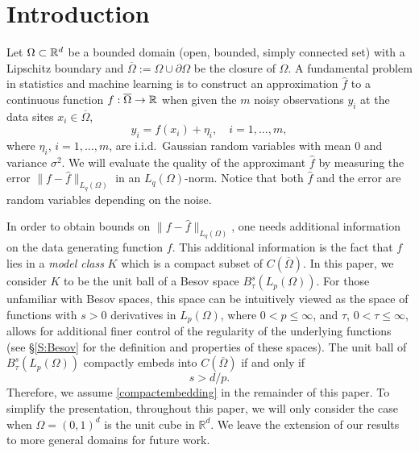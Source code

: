 \section{Introduction}
\label{intro}
Let $\Omega \subset \mathbb{R}^d$ be a bounded domain (open, bounded, simply connected set) with a Lipschitz boundary and  $\overline{\Omega}:= \Omega \cup \partial\Omega$ be the closure of $\Omega$. 
A fundamental problem in statistics and machine learning is to construct an   approximation $\hat{f}$ to a continuous function $f: \overline{\Omega}\to \mathbb{R}$ when given the $m$  noisy observations $y_i$ at the data sites $x_i\in\overline \Omega$, 
\begin{equation} \label{eq:observations}
    y_i = f(x_i) + \eta_i, \quad i = 1, \ldots, m,
\end{equation}
where  $\eta_i$, $i = 1, \ldots, m$, are i.i.d.\ Gaussian random variables with mean $0$ and variance $\sigma^2$.
We will evaluate the quality of the approximant  $\hat f$ by  measuring  the 
error $\|f-\hat f\|_{L_q(\Omega)}$  in 
an $L_q(\Omega)$-norm.  Notice that both $\hat f$ and the error  are random variables depending on the noise.
 
In order to obtain bounds on $\|f-\hat f\|_{L_q(\Omega)}$,  one  needs additional information on the data generating function $f$.  This additional information is the fact  that $f$ lies in a \emph{model class} $K$ which is a compact subset of $C(\overline{\Omega})$. In this paper, we consider $K$ to be the unit ball of a Besov space $B^s_\tau(L_p({\Omega}))$.  For those unfamiliar with Besov spaces, this space   can be intuitively viewed as the space of functions with $s > 0$ derivatives in $L_p({\Omega})$, where $0 < p \leq \infty$,  and $\tau$,   $0 < \tau \leq \infty$, allows for additional finer control of the regularity of the underlying functions (see \S \ref{S:Besov} for the definition and properties of these spaces). The unit ball of $B^s_\tau(L_p({\Omega}))$ compactly embeds into $C(\overline{\Omega})$ if and only if 
\begin{equation}
\label{compactembedding}
s>d/p.
\end{equation}
Therefore, we assume \eqref{compactembedding} in the remainder of this paper. To simplify the presentation, throughout this paper, we will only consider the case when $\Omega = (0,1)^d$ is the unit cube in $\mathbb{R}^d$.  We leave the  extension of our results to more general domains for future work.

